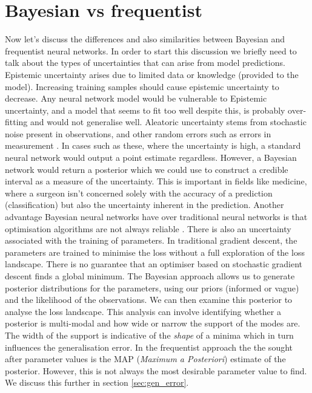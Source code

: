 \documentclass[review]{siamart190516}
\begin{document}
\section{Bayesian vs frequentist} \label{sec:bayes_freq}
Now let's discuss the differences and also similarities between Bayesian and frequentist neural networks. In order to start this discussion we briefly need to talk about the types of uncertainties that can arise from model predictions.
Epistemic uncertainty arises due to limited data or knowledge (provided to the model). Increasing training samples should cause epistemic uncertainty to decrease. Any neural network model would be vulnerable to Epistemic uncertainty, and a model that seems to fit too well despite this, is probably over-fitting and would not generalise well. \newline
Aleatoric uncertainty stems from stochastic noise present in observations, and other random errors such as errors in measurement \cite{yarin2016uncertainty}.
In cases such as these, where the uncertainty is high, a standard neural network would output a point estimate regardless. However, a Bayesian network would return a posterior which we could use to construct a credible interval as a measure of the uncertainty. This is important in fields like medicine, where a surgeon isn’t concerned solely with the accuracy of a prediction (classification) but also the uncertainty inherent in the prediction. 
\newline 
Another advantage Bayesian neural networks have over traditional neural networks is that optimisation algorithms are not always reliable \cite{reliablitiy}. There is also an uncertainty associated with the training of parameters. In traditional gradient descent, the parameters are trained to minimise the loss without a full exploration of the loss landscape. There is no guarantee that an optimiser based on stochastic gradient descent finds a global minimum.
\newline 
The Bayesian approach allows us to generate posterior distributions for the parameters, using our priors (informed or vague) and the likelihood of the observations. We can then examine this posterior to analyse the loss landscape. This analysis can involve identifying whether a posterior is multi-modal and how wide or narrow the support of the modes are. The width of the support is indicative of the \textit{shape} of a minima which in turn influences the generalisation error. In the frequentist approach the the sought after parameter values is the  MAP (\textit{Maximum a Posteriori}) estimate of the posterior. However, this is not always the most desirable parameter value to find. We discuss this further in section \ref{sec:gen_error}.
\end{document}
